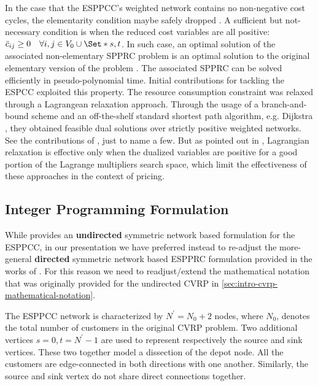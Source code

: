 \medskip

In the case that the ESPPCC's weighted network contains no non-negative
cost cycles, the elementarity condition maybe safely dropped \parencite{beasley1989}.
A sufficient but not-necessary condition is when the reduced cost variables
are all positive: $\bar{c}_{ij} \ge 0 \quad \forall i, j \in V_0 \cup \Set*{s, t}$.
In such case, an optimal solution of the associated non-elementary SPPRC problem
is an optimal solution to the original elementary version of the problem \parencite{beasley1989}.
The associated SPPRC can be solved efficiently in pseudo-polynomial time.
Initial contributions for tackling the ESPCC exploited this property.
The resource consumption constraint was relaxed through a Lagrangean relaxation
approach.
Through the usage of a branch-and-bound scheme and an off-the-shelf
standard shortest path algorithm, e.g. Dijkstra \parencite{sniedovich2006dijkstra},
they obtained feasible dual solutions over strictly positive weighted networks.
See the contributions of
\textcite{beasley1989, dumitrescu2003improved, carlyle2008, muhandiramge2009simultaneous},
just to name a few.
But as pointed out in \textcite{righini2004},
Lagrangian relaxation is effective only when the dualized variables
are positive for a good portion of the Lagrange multipliers search space,
which limit the effectiveness of these approaches in the context of pricing.

\subsection{Integer Programming Formulation}
\label{sec:espprc-integer-programming-formulation}

While \textcite{jepsen2008branchandcut} provides
an \textbf{undirected} symmetric network based formulation for the ESPPCC,
in our presentation we have preferred instead to re-adjust the more-general
\textbf{directed} symmetric network based ESPPRC formulation
provided in the works of \textcite{beasley1989, toth2002, toth2014}.
For this reason we need to readjust/extend the
mathematical notation that was originally provided for the undirected CVRP in \cref{sec:intro-cvrp-mathematical-notation}.

\medskip

The ESPPCC network is characterized by $N^\prime = N_0 + 2$ nodes,
where $N_0$, denotes the total number of customers in the original CVRP problem.
Two additional vertices $s = 0, t = N^\prime - 1$ are used to represent respectively the source and sink vertices.
These two together model a dissection of the depot node.
All the customers are edge-connected in both directions with one another.
Similarly, the source and sink vertex do not share direct connections together.

